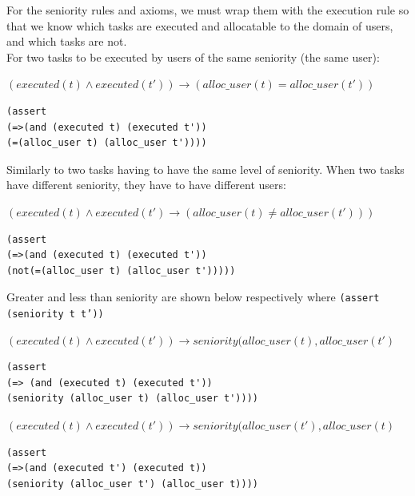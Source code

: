 \documentclass[a4paper]{report}
\begin{document}
For the seniority rules and axioms, we must wrap them with the execution rule so that we know which tasks are executed and allocatable to the domain of users, and which tasks are not. \\

For two tasks to be executed by users of the same seniority (the same user):
\begin{center}
$(executed(t) \wedge executed(t\ensuremath{'})) \longrightarrow (alloc\_user(t) = alloc\_user(t\ensuremath{'}))$
\end{center}
\begin{lstlisting}[frame=single]
(assert 
(=>(and (executed t) (executed t'))
(=(alloc_user t) (alloc_user t'))))
\end{lstlisting}

Similarly to two tasks having to have the same level of seniority. When two tasks have different seniority, they have to have different users:
\begin{center}
$(executed(t) \wedge executed(t\ensuremath{'}) \longrightarrow (alloc\_user(t) \neq alloc\_user(t\ensuremath{'})))$
\end{center}

\begin{lstlisting}[frame=single]
(assert 
(=>(and (executed t) (executed t'))
(not(=(alloc_user t) (alloc_user t')))))
\end{lstlisting}

Greater and less than seniority are shown below respectively where \texttt{(assert (seniority t t'))}
\begin{center}
$(executed(t) \wedge executed(t\ensuremath{'})) \longrightarrow seniority(alloc\_user(t), alloc\_user(t\ensuremath{'})$
\end{center}
\begin{lstlisting}[frame=single]
(assert 
(=> (and (executed t) (executed t'))
(seniority (alloc_user t) (alloc_user t'))))
\end{lstlisting}
\begin{center}
$(executed(t) \wedge executed(t\ensuremath{'})) \longrightarrow seniority(alloc\_user(t\ensuremath{'}), alloc\_user(t)$
\end{center}
\begin{lstlisting}[frame=single]
(assert 
(=>(and (executed t') (executed t))
(seniority (alloc_user t') (alloc_user t))))
\end{lstlisting}
\end{document}
